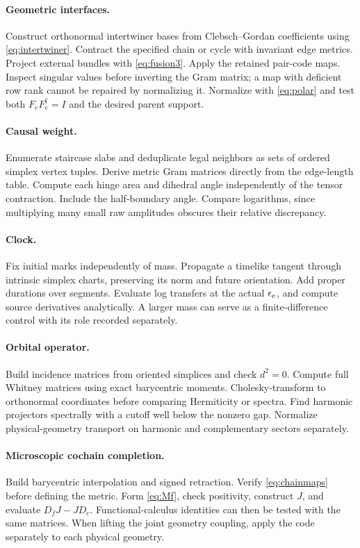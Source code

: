 \paragraph{Geometric interfaces.}
Construct orthonormal intertwiner bases from Clebsch--Gordan coefficients using \eqref{eq:intertwiner}. Contract the specified chain or cycle with invariant edge metrics. Project external bundles with \eqref{eq:fusion3}. Apply the retained pair-code maps. Inspect singular values before inverting the Gram matrix; a map with deficient row rank cannot be repaired by normalizing it. Normalize with \eqref{eq:polar} and test both $F_eF_e^\dagger=I$ and the desired parent support.

\paragraph{Causal weight.}
Enumerate staircase slabs and deduplicate legal neighbors as sets of ordered simplex vertex tuples. Derive metric Gram matrices directly from the edge-length table. Compute each hinge area and dihedral angle independently of the tensor contraction. Include the half-boundary angle. Compare logarithms, since multiplying many small raw amplitudes obscures their relative discrepancy.

\paragraph{Clock.}
Fix initial marks independently of mass. Propagate a timelike tangent through intrinsic simplex charts, preserving its norm and future orientation. Add proper durations over segments. Evaluate log transfers at the actual $\epsilon_e$, and compute source derivatives analytically. A larger mass can serve as a finite-difference control with its role recorded separately.

\paragraph{Orbital operator.}
Build incidence matrices from oriented simplices and check $d^2=0$. Compute full Whitney matrices using exact barycentric moments. Cholesky-transform to orthonormal coordinates before comparing Hermiticity or spectra. Find harmonic projectors spectrally with a cutoff well below the nonzero gap. Normalize physical-geometry transport on harmonic and complementary sectors separately.

\paragraph{Microscopic cochain completion.}
Build barycentric interpolation and signed retraction. Verify \eqref{eq:chainmaps} before defining the metric. Form \eqref{eq:Mf}, check positivity, construct $J$, and evaluate $D_fJ-JD_c$. Functional-calculus identities can then be tested with the same matrices. When lifting the joint geometry coupling, apply the code separately to each physical geometry.

